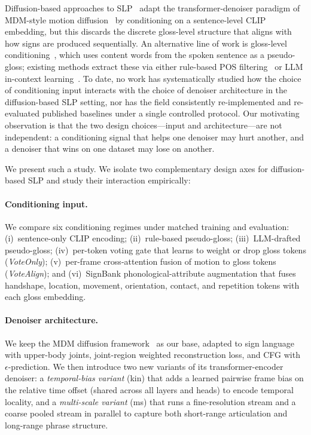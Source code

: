 \documentclass{article}
\begin{document}
Diffusion-based approaches to SLP~\citep{hong2026phonologyguided} adapt the transformer-denoiser paradigm of MDM-style motion diffusion~\citep{tevet2023human} by conditioning on a sentence-level CLIP embedding, but this discards the discrete gloss-level structure that aligns with how signs are produced sequentially.
An alternative line of work is gloss-level conditioning~\citep{zheng2023sign2gpt,wong2025pgg}, which uses content words from the spoken sentence as a pseudo-gloss; existing methods extract these via either rule-based POS filtering~\citep{zheng2023sign2gpt} or LLM in-context learning~\citep{wong2025pgg}.
To date, no work has systematically studied how the choice of conditioning input interacts with the choice of denoiser architecture in the diffusion-based SLP setting, nor has the field consistently re-implemented and re-evaluated published baselines under a single controlled protocol.
Our motivating observation is that the two design choices---input and architecture---are not independent: a conditioning signal that helps one denoiser may hurt another, and a denoiser that wins on one dataset may lose on another.

We present such a study. We isolate two complementary design axes for diffusion-based SLP and study their interaction empirically:

\paragraph{Conditioning input.}
We compare six conditioning regimes under matched training and evaluation: (i)~sentence-only CLIP encoding; (ii)~rule-based pseudo-gloss; (iii)~LLM-drafted pseudo-gloss; (iv)~per-token voting gate that learns to weight or drop gloss tokens (\emph{VoteOnly}); (v)~per-frame cross-attention fusion of motion to gloss tokens (\emph{VoteAlign}); and (vi)~SignBank phonological-attribute augmentation that fuses handshape, location, movement, orientation, contact, and repetition tokens with each gloss embedding.

\paragraph{Denoiser architecture.}
We keep the MDM diffusion framework~\citep{tevet2023human} as our base, adapted to sign language with upper-body joints, joint-region weighted reconstruction loss, and CFG with $\epsilon$-prediction.
We then introduce two new variants of its transformer-encoder denoiser: a \emph{temporal-bias variant} (kin) that adds a learned pairwise frame bias on the relative time offset (shared across all layers and heads) to encode temporal locality, and a \emph{multi-scale variant} (ms) that runs a fine-resolution stream and a coarse pooled stream in parallel to capture both short-range articulation and long-range phrase structure.
\end{document}
